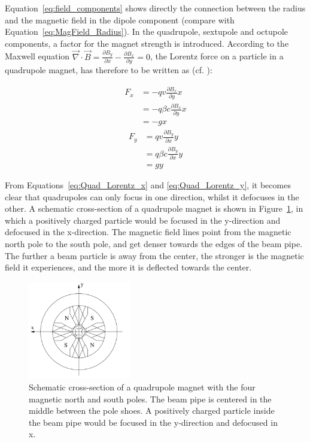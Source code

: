 Equation~\ref{eq:field_components} shows directly the connection between the radius and the magnetic field in the dipole component (compare with Equation~\ref{eq:MagField_Radius}).
In the quadrupole, sextupole and octupole components, a factor for the magnet strength is introduced.
According to the Maxwell equation $\vec{\nabla}\cdot\vec{B} = \frac{\partial B_y}{\partial x} -\frac{\partial B_x}{\partial y} = 0$, the Lorentz force on a particle in a quadrupole magnet, has therefore to be written as (cf. \cite[p. 372]{VacuumElectronics}):
\begin{multicols}{2}
\noindent 
\begin{align}
 F_x &= -qv\frac{\partial B_x}{\partial y}x \nonumber\\
  &= -q\beta c\frac{\partial B_x}{\partial y}x\\
  &= -gx\label{eq:Quad_Lorentz_x}
\end{align}
\columnbreak
\begin{align}
 F_y &= qv\frac{\partial B_y}{\partial x}y\nonumber \\
  &= q\beta c\frac{\partial B_y}{\partial x}y\\
  &= gy \label{eq:Quad_Lorentz_y}
\end{align}
\end{multicols}
From Equations~\ref{eq:Quad_Lorentz_x} and \ref{eq:Quad_Lorentz_y}, it becomes clear that quadrupoles can only focus in one direction, whilst it defocuses in the other.
A schematic cross-section of a quadrupole magnet is shown in Figure~\ref{fig:Quadrupole}, in which a positively charged particle would be focused in the y-direction and defocused in the x-direction.
The magnetic field lines point from the magnetic north pole to the south pole, and get denser towards the edges of the beam pipe.
The further a beam particle is away from the center, the stronger is the magnetic field it experiences, and the more it is deflected towards the center.
\begin{figure}
\centering
\includegraphics[width=0.4\textwidth]{Figures/Quadrupole.png}
\caption[Cross-section of a quadrupole magnet]{Schematic cross-section of a quadrupole magnet with the four magnetic north and south poles.
The beam pipe is centered in the middle between the pole shoes.
A positively charged particle inside the beam pipe would be focused in the y-direction and defocused in x.~\cite[p. 88]{Hinterberger}}
\label{fig:Quadrupole}
\end{figure}

